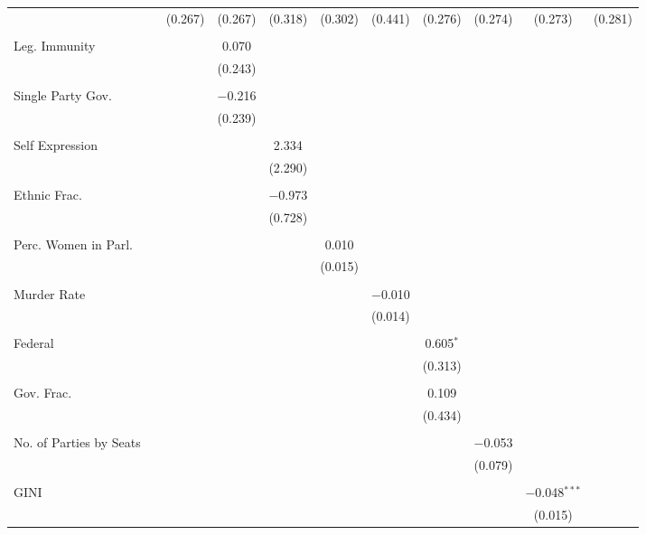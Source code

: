 \documentclass[a4paper]{article}\usepackage[]{graphicx}\usepackage[]{color}
\begin{document}
\begin{table}
\begin{center}
{{\begin{tabular}{@{\extracolsep{5pt}}lcccccccccc}
  &  & (0.267) & (0.267) & (0.318) & (0.302) & (0.441) & (0.276) & (0.274) & (0.273) & (0.281) \\ 
  & & & & & & & & & & \\ 
 Leg. Immunity &  &  & 0.070 &  &  &  &  &  &  &  \\ 
  &  &  & (0.243) &  &  &  &  &  &  &  \\ 
  & & & & & & & & & & \\ 
 Single Party Gov. &  &  & $-$0.216 &  &  &  &  &  &  &  \\ 
  &  &  & (0.239) &  &  &  &  &  &  &  \\ 
  & & & & & & & & & & \\ 
 Self Expression &  &  &  & 2.334 &  &  &  &  &  &  \\ 
  &  &  &  & (2.290) &  &  &  &  &  &  \\ 
  & & & & & & & & & & \\ 
 Ethnic Frac. &  &  &  & $-$0.973 &  &  &  &  &  &  \\ 
  &  &  &  & (0.728) &  &  &  &  &  &  \\ 
  & & & & & & & & & & \\ 
 Perc. Women in Parl. &  &  &  &  & 0.010 &  &  &  &  &  \\ 
  &  &  &  &  & (0.015) &  &  &  &  &  \\ 
  & & & & & & & & & & \\ 
 Murder Rate &  &  &  &  &  & $-$0.010 &  &  &  &  \\ 
  &  &  &  &  &  & (0.014) &  &  &  &  \\ 
  & & & & & & & & & & \\ 
 Federal &  &  &  &  &  &  & 0.605$^{*}$ &  &  &  \\ 
  &  &  &  &  &  &  & (0.313) &  &  &  \\ 
  & & & & & & & & & & \\ 
 Gov. Frac. &  &  &  &  &  &  & 0.109 &  &  &  \\ 
  &  &  &  &  &  &  & (0.434) &  &  &  \\ 
  & & & & & & & & & & \\ 
 No. of Parties by Seats &  &  &  &  &  &  &  & $-$0.053 &  &  \\ 
  &  &  &  &  &  &  &  & (0.079) &  &  \\ 
  & & & & & & & & & & \\ 
 GINI &  &  &  &  &  &  &  &  & $-$0.048$^{***}$ &  \\ 
  &  &  &  &  &  &  &  &  & (0.015) &  \\ 

\end{tabular}}}
\end{center}
\end{table}
\end{document}
